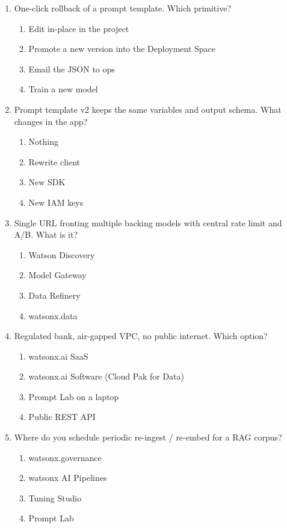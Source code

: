 \begin{enumerate}[leftmargin=*]
\item One-click rollback of a prompt template. Which primitive?
\begin{enumerate}[label=\Alph*.]
  \item Edit in-place in the project \item Promote a new version into the Deployment Space
  \item Email the JSON to ops \item Train a new model
\end{enumerate}

\item Prompt template v2 keeps the same variables and output schema. What changes in the app?
\begin{enumerate}[label=\Alph*.]
  \item Nothing \item Rewrite client \item New SDK \item New IAM keys
\end{enumerate}

\item Single URL fronting multiple backing models with central rate limit and A/B. What is it?
\begin{enumerate}[label=\Alph*.]
  \item Watson Discovery \item Model Gateway \item Data Refinery \item watsonx.data
\end{enumerate}

\item Regulated bank, air-gapped VPC, no public internet. Which option?
\begin{enumerate}[label=\Alph*.]
  \item watsonx.ai SaaS \item watsonx.ai Software (Cloud Pak for Data)
  \item Prompt Lab on a laptop \item Public REST API
\end{enumerate}

\item Where do you schedule periodic re-ingest / re-embed for a RAG corpus?
\begin{enumerate}[label=\Alph*.]
  \item watsonx.governance \item watsonx AI Pipelines
  \item Tuning Studio \item Prompt Lab
\end{enumerate}


\end{enumerate}
